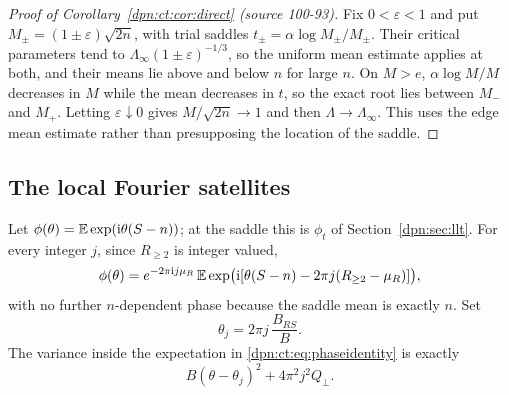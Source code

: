 \documentclass[11pt]{article}
\numberwithin{equation}{section}
\theoremstyle{definition}\newtheorem{definition}[theorem]{Definition}
\theoremstyle{remark}\newtheorem{remark}[theorem]{Remark}
\newcommand{\src}[1]{\textup{(source #1)}}
\begin{document}
\begin{proof}[Proof of Corollary~\ref{dpn:ct:cor:direct} \src{100-93}]
Fix $0<\varepsilon<1$ and put $M_\pm=(1\pm\varepsilon)\sqrt{2n}$, with trial
saddles $t_\pm=\alpha\log M_\pm/M_\pm$.  Their critical parameters tend to
$\Lambda_\infty(1\pm\varepsilon)^{-1/3}$, so the uniform mean estimate applies at
both, and their means lie above and below $n$ for large $n$.  On $M>e$,
$\alpha\log M/M$ decreases in $M$ while the mean decreases in $t$, so the
exact root lies between $M_-$ and $M_+$.  Letting $\varepsilon\downarrow0$
gives $M/\sqrt{2n}\to1$ and then $\Lambda\to\Lambda_\infty$.  This uses the edge
mean estimate rather than presupposing the location of the saddle.
\end{proof}

\subsection{The local Fourier satellites}\label{dpn:ct:sec:satellites}
Let $\phi(\theta)=\mathbb E\exp(\mathrm i\theta(S-n))$; at the saddle this is $\phi_t$ of
Section~\ref{dpn:sec:llt}.  For every integer $j$, since $R_{\ge2}$ is
integer valued,
\begin{equation}\label{dpn:ct:eq:phaseidentity}
 \phi(\theta)=e^{-2\pi\mathrm i j\mu_R}\,
   \mathbb E\exp\bigl(\mathrm i[\theta(S-n)-2\pi j(R_{\ge2}-\mu_R)]\bigr),
\end{equation}
with no further $n$-dependent phase because the saddle mean is exactly $n$.
Set
\begin{equation}\label{dpn:ct:eq:satellitecenter}
 \theta_j=2\pi j\,\frac{B_{RS}}B.
\end{equation}
The variance inside the expectation in \eqref{dpn:ct:eq:phaseidentity} is
exactly
\begin{equation}\label{dpn:ct:eq:variancecomplete}
 B(\theta-\theta_j)^2+4\pi^2j^2Q_\perp.
\end{equation}
\end{document}
